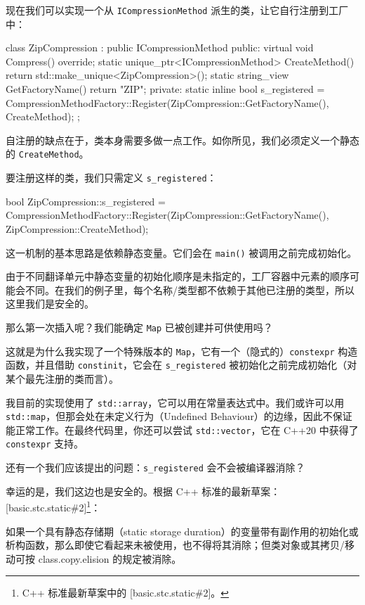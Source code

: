 现在我们可以实现一个从 \texttt{ICompressionMethod} 派生的类，让它自行注册到工厂中：

\begin{codebox}[cpp]
class ZipCompression : public ICompressionMethod {
public:
virtual void Compress() override;
static unique_ptr<ICompressionMethod> CreateMethod() {
return std::make_unique<ZipCompression>();
}
static string_view GetFactoryName() { return "ZIP"; }
private:
static inline bool s_registered =
CompressionMethodFactory::Register(ZipCompression::GetFactoryName(),
CreateMethod);
};
\end{codebox}

自注册的缺点在于，类本身需要多做一点工作。如你所见，我们必须定义一个静态的 \texttt{CreateMethod}。

要注册这样的类，我们只需定义 \texttt{s\_registered}：

\begin{codebox}[cpp]
bool ZipCompression::s_registered =
CompressionMethodFactory::Register(ZipCompression::GetFactoryName(),
ZipCompression::CreateMethod);
\end{codebox}

这一机制的基本思路是依赖静态变量。它们会在 \texttt{main()} 被调用之前完成初始化。

由于不同翻译单元中静态变量的初始化顺序是未指定的，工厂容器中元素的顺序可能会不同。在我们的例子里，每个名称/类型都不依赖于其他已注册的类型，所以这里我们是安全的。

那么第一次插入呢？我们能确定 \texttt{Map} 已被创建并可供使用吗？

这就是为什么我实现了一个特殊版本的 \texttt{Map}，它有一个（隐式的）\texttt{constexpr} 构造函数，并且借助 \texttt{constinit}，它会在 \texttt{s\_registered} 被初始化之前完成初始化（对某个最先注册的类而言）。

\begin{myInfoBox}
我目前的实现使用了 \texttt{std::array}，它可以用在常量表达式中。我们或许可以用 \texttt{std::map}，但那会处在未定义行为（Undefined Behaviour）的边缘，因此不保证能正常工作。在最终代码里，你还可以尝试 \texttt{std::vector}，它在 C++20 中获得了 \texttt{constexpr} 支持。
\end{myInfoBox}


还有一个我们应该提出的问题：\texttt{s\_registered} 会不会被编译器消除？

幸运的是，我们这边也是安全的。根据 C++ 标准的最新草案：[basic.stc.static\#2]\footnote{C++ 标准最新草案中的 [basic.stc.static\#2]。}：

\begin{myQuote}
如果一个具有静态存储期（static storage duration）的变量带有副作用的初始化或析构函数，那么即使它看起来未被使用，也不得将其消除；但类对象或其拷贝/移动可按 class.copy.elision 的规定被消除。
\end{myQuote}

